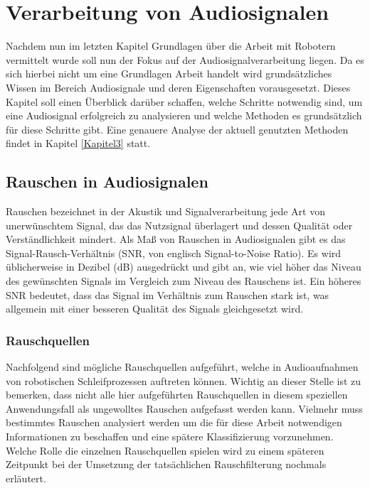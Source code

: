\section{Verarbeitung von Audiosignalen}
Nachdem nun im letzten Kapitel Grundlagen über die Arbeit mit Robotern vermittelt wurde soll nun der Fokus auf der Audiosignalverarbeitung liegen. Da es sich hierbei nicht um eine Grundlagen Arbeit handelt wird grundsätzliches Wissen im Bereich Audiosignale und deren Eigenschaften vorausgesetzt. Dieses Kapitel soll einen Überblick darüber schaffen, welche Schritte notwendig sind, um eine Audiosignal erfolgreich zu analysieren und welche Methoden es grundsätzlich für diese Schritte gibt. Eine genauere Analyse der aktuell genutzten Methoden findet in Kapitel \ref{Kapitel3} statt. 

\subsection{Rauschen in Audiosignalen}
Rauschen bezeichnet in der Akustik und Signalverarbeitung jede Art von unerwünschtem Signal, das das Nutzsignal überlagert und dessen Qualität oder Verständlichkeit mindert. Als Maß von Rauschen in Audiosignalen gibt es das Signal-Rausch-Verhältnis (SNR, von englisch Signal-to-Noise Ratio). Es wird üblicherweise in Dezibel (dB) ausgedrückt und gibt an, wie viel höher das Niveau des gewünschten Signals im Vergleich zum Niveau des Rauschens ist. Ein höheres SNR bedeutet, dass das Signal im Verhältnis zum Rauschen stark ist, was allgemein mit einer besseren Qualität des Signals gleichgesetzt wird.


\subsubsection{Rauschquellen}
Nachfolgend sind mögliche Rauschquellen aufgeführt, welche in Audioaufnahmen von robotischen Schleifprozessen auftreten können. Wichtig an dieser Stelle ist zu bemerken, dass nicht alle hier aufgeführten Rauschquellen in diesem speziellen Anwendungsfall als ungewolltes Rauschen aufgefasst werden kann. Vielmehr muss bestimmtes Rauschen analysiert werden um die für diese Arbeit notwendigen Informationen zu beschaffen und eine spätere Klassifizierung vorzunehmen. Welche Rolle die einzelnen Rauschquellen spielen wird zu einem späteren Zeitpunkt bei der Umsetzung der tatsächlichen Rauschfilterung nochmals erläutert.

